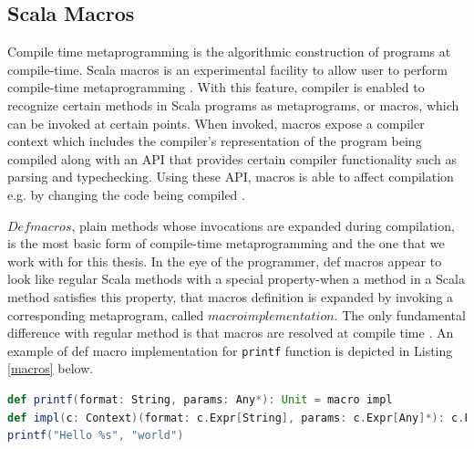 \subsection{Scala Macros}
Compile time metaprogramming is the algorithmic construction of programs at compile-time. Scala macros is an experimental facility to allow user to perform compile-time metaprogramming \cite{burmako2012scala}. With this feature, compiler is enabled to recognize certain methods in Scala programs as metaprograms, or macros, which can be invoked at certain points. When invoked, macros expose a compiler context which includes the compiler's representation of the program being compiled along with an API that provides certain compiler functionality such as parsing and typechecking. Using these API, macros is able to affect compilation e.g. by changing the code being compiled \cite{burmako2013scala}.

$Def macros$, plain methods whose invocations are expanded during compilation, is the most basic form of compile-time metaprogramming and the one that we work with for this thesis. In the eye of the programmer, def macros appear to look like regular Scala methods with a special property-when a method in a Scala method satisfies this property, that macros definition is expanded by invoking a corresponding metaprogram, called $macro implementation$. The only fundamental difference with regular method is that macros are resolved at compile time  \cite{burmako2013scala}. An example of def macro implementation for \texttt{printf} function is depicted in Listing \ref{macros} below.
\begin{lstlisting}[language=scala,caption=Macros Printf Function \cite{burmako2013scala}, label = macros]
def printf(format: String, params: Any*): Unit = macro impl
def impl(c: Context)(format: c.Expr[String], params: c.Expr[Any]*): c.Expr[Unit] = ...
printf("Hello %s", "world")
\end{lstlisting}


